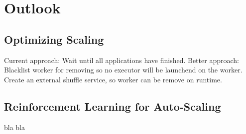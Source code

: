 \chapter{Outlook}
\label{chap:08_outlook}
%

\section{Optimizing Scaling}
Current approach: Wait until all applications have finished.
Better approach: Blacklist worker for removing so no executor will be launchend on the worker.
Create an external shuffle service, so worker can be remove on runtime.


\section{Reinforcement Learning for Auto-Scaling}
bla bla
